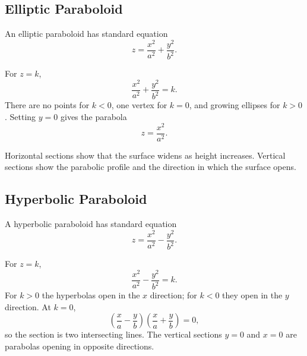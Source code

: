 \subsection{Elliptic Paraboloid}

\begin{definitionbox}
An elliptic paraboloid has standard equation
\[
\boxed{
z=\frac{x^2}{a^2}+\frac{y^2}{b^2}
}.
\]
\end{definitionbox}

\begin{derivationbox}
For $z=k$,
\[
\frac{x^2}{a^2}+\frac{y^2}{b^2}=k.
\]
There are no points for $k<0$, one vertex for $k=0$, and growing ellipses for
$k>0$. Setting $y=0$ gives the parabola
\[
z=\frac{x^2}{a^2}.
\]
\end{derivationbox}

\begin{interpretationbox}
Horizontal sections show that the surface widens as height increases. Vertical
sections show the parabolic profile and the direction in which the surface
opens.
\end{interpretationbox}

\begin{center}
\end{center}

\subsection{Hyperbolic Paraboloid}

\begin{definitionbox}
A hyperbolic paraboloid has standard equation
\[
\boxed{
z=\frac{x^2}{a^2}-\frac{y^2}{b^2}
}.
\]
\end{definitionbox}

\begin{derivationbox}
For $z=k$,
\[
\frac{x^2}{a^2}-\frac{y^2}{b^2}=k.
\]
For $k>0$ the hyperbolas open in the $x$ direction; for $k<0$ they open in the
$y$ direction. At $k=0$,
\[
\left(\frac xa-\frac yb\right)
\left(\frac xa+\frac yb\right)=0,
\]
so the section is two intersecting lines. The vertical sections $y=0$ and $x=0$
are parabolas opening in opposite directions.
\end{derivationbox}

